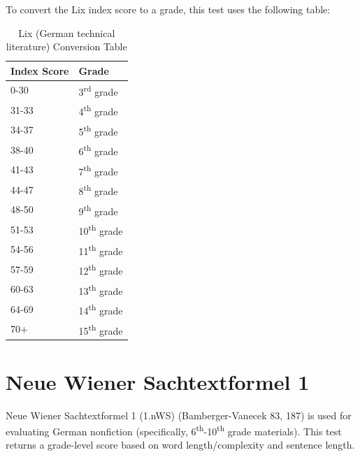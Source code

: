 \documentclass[
]{book}
\theoremstyle{definition}
\theoremstyle{definition}
\theoremstyle{definition}
\theoremstyle{definition}
\theoremstyle{remark}
\begin{document}
\begin{minipage}{\textwidth}

To convert the Lix index score to a grade, this test uses the following table:

\begin{table}

\caption{\label{tab:unnamed-chunk-22}Lix (German technical literature) Conversion Table}
\centering
\begin{tabular}[t]{ll}
\toprule
Index Score & Grade\\
\midrule
0-30 & 3\textsuperscript{rd} grade\\
31-33 & 4\textsuperscript{th} grade\\
34-37 & 5\textsuperscript{th} grade\\
38-40 & 6\textsuperscript{th} grade\\
41-43 & 7\textsuperscript{th} grade\\
44-47 & 8\textsuperscript{th} grade\\
48-50 & 9\textsuperscript{th} grade\\
51-53 & 10\textsuperscript{th} grade\\
54-56 & 11\textsuperscript{th} grade\\
57-59 & 12\textsuperscript{th} grade\\
60-63 & 13\textsuperscript{th} grade\\
64-69 & 14\textsuperscript{th} grade\\
70+ & 15\textsuperscript{th} grade\\
\bottomrule
\end{tabular}
\end{table}

\end{minipage}

\newpage

\hypertarget{neue-wiener-sachtextformel1}{%
\section{\texorpdfstring{Neue Wiener Sachtextformel 1}{Neue Wiener Sachtextformel 1}}\label{neue-wiener-sachtextformel1}}

Neue Wiener Sachtextformel 1 (1.nWS) (Bamberger-Vanecek 83, 187) is used for evaluating German nonfiction (specifically, 6\textsuperscript{th}-10\textsuperscript{th} grade materials). This test returns a grade-level score based on word length/complexity and sentence length.
\end{document}
